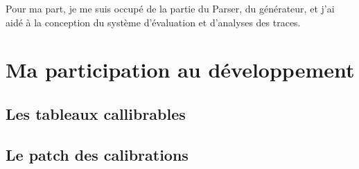 	Pour ma part, je me suis occupé de la partie du Parser, du générateur, et j'ai aidé à la conception du système d'évaluation et d'analyses des traces.
	\vfill~\vfill
	\section{Ma participation au développement}
	\subsection{Les tableaux callibrables}
	\subsection{Le patch des calibrations}


